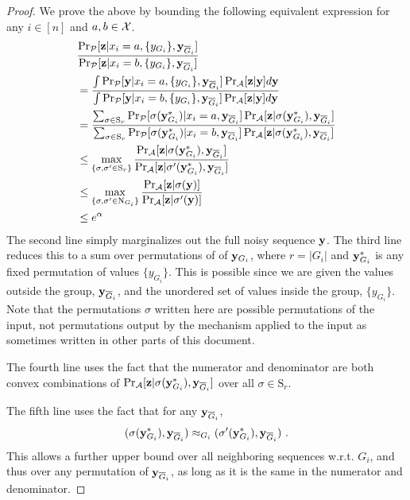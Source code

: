 \begin{proof}
We prove the above by bounding the following equivalent expression for any $i \in [n]$ and $a, b \in \mathcal{X}$. 
\begin{align*}
     &\frac{\Pr_{\mathcal{P}}[\mathbf{z} | x_i=a, \{y_{G_i}\}, \mathbf{y}_{\overline{G}_i}]}{\Pr_{\mathcal{P}} [\mathbf{z} | x_i=b, \{y_{G_i}\}, \mathbf{y}_{\overline{G}_i}]}\\
     &= \frac{\int \Pr_{\mathcal{P}} [\mathbf{y} | x_i = a, \{y_{G_i}\}, \mathbf{y}_{\overline{G}_i}] \Pr_{\mathcal{A}}[\mathbf{z} | \mathbf{y}] d\mathbf{y}}{\int \Pr_{\mathcal{P}} [\mathbf{y} | x_i = b, \{y_{G_i}\}, \mathbf{y}_{\overline{G}_i}] \Pr_{\mathcal{A}}[\mathbf{z} | \mathbf{y}] d\mathbf{y}} \\
     &= \frac{\sum_{\sigma \in \mathrm{S}_r} \Pr_{\mathcal{P}}[ \sigma(\mathbf{y}_{G_i}^*) | x_i = a, \mathbf{y}_{\overline{G}_i}] \Pr_{\mathcal{A}} [\mathbf{z} | \sigma(\mathbf{y}_{G_i}^*), \mathbf{y}_{\overline{G}_i}] }
     {\sum_{\sigma \in \mathrm{S}_r} \Pr_{\mathcal{P}}[ \sigma(\mathbf{y}_{G_i}^*) | x_i = b, \mathbf{y}_{\overline{G}_i}] \Pr_{\mathcal{A}} [\mathbf{z} | \sigma(\mathbf{y}_{G_i}^*), \mathbf{y}_{\overline{G}_i}]} \\
     &\leq \max_{\{ \sigma, \sigma' \in \mathrm{S}_r\}}
     \frac{ \Pr_{\mathcal{A}} [\mathbf{z} | \sigma(\mathbf{y}_{G_i}^*), \mathbf{y}_{\overline{G}_i}]}{ \Pr_{\mathcal{A}} [\mathbf{z} | \sigma'(\mathbf{y}_{G_i}^*), \mathbf{y}_{\overline{G}_i}]}  \\
     &\leq \max_{\{ \sigma, \sigma' \in \mathrm{N}_{G_i}\}}
     \frac{\Pr_{\mathcal{A}}[\mathbf{z} | \sigma(\mathbf{y})]}{\Pr_{\mathcal{A}}[\mathbf{z} | \sigma'(\mathbf{y})]}  \\
     &\leq e^\alpha 
\end{align*}
The second line simply marginalizes out the full noisy sequence $\mathbf{y}$. The third line reduces this to a sum over permutations of of $\mathbf{y}_{G_i}$, where $r = |G_i|$ and $\mathbf{y}^*_{G_i}$ is any fixed permutation of values $\{y_{G_i}\}$. This is possible since we are given the values outside the group, $\mathbf{y}_{\overline{G}_i}$, and the unordered set of values inside the group, $\{y_{G_i}\}$. Note that the permutations $\sigma$ written here are possible permutations of the \ldp input, not permutations output by the mechanism applied to the input as sometimes written in other parts of this document. 

The fourth line uses the fact that the numerator and denominator are both convex combinations of $\Pr_{\mathcal{A}} [\mathbf{z} | \sigma(\mathbf{y}_{G_i}^*), \mathbf{y}_{\overline{G}_i}]$ over all $\sigma \in \mathrm{S}_r$. 

The fifth line uses the fact that for any $\mathbf{y}_{\overline{G}_i}$, $$(\sigma(\mathbf{y}_{G_i}^*), \mathbf{y}_{\overline{G}_i}) \approx_{G_i} (\sigma'(\mathbf{y}_{G_i}^*), \mathbf{y}_{\overline{G}_i}) \ . $$
This allows a further upper bound over all neighboring sequences w.r.t. $G_i$, and thus over any permutation of $\mathbf{y}_{\overline{G}_i}$, as long as it is the same in the numerator and denominator. 
\end{proof}

